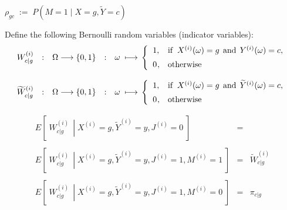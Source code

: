 $\rho_{gc} \;:=\; P\!\left(M=1\;\vert\;X=g,\widetilde{Y}=c\right)$

\vskip 0.3cm
\noindent
Define the following Bernoulli random variables (indicator variables):
\begin{equation*}
\begin{array}{ccccl}
	W^{(i)}_{c \vert g} &:& \Omega \longrightarrow \{0,1\} &:& \omega\;\longmapsto\,
	\left\{
		\begin{array}{cl}
		1, & \textnormal{if}\;\; X^{(i)}(\omega) = g \,\;\textnormal{and}\;\, Y^{(i)}(\omega) = c,
		\\
		\overset{{\color{white}-}}{0}, & \textnormal{otherwise}
		\end{array}
	\right.
\\ \\
	\widetilde{W}^{(i)}_{c \vert g} &:& \Omega \longrightarrow \{0,1\} &:& \omega\;\longmapsto\,
	\left\{
		\begin{array}{cl}
		1, & \textnormal{if}\;\; X^{(i)}(\omega) = g \,\;\textnormal{and}\;\, \widetilde{Y}^{(i)}(\omega) = c,
		\\
		\overset{{\color{white}-}}{0}, & \textnormal{otherwise}
		\end{array}
	\right.
\end{array}
\end{equation*}

\vskip 0.3cm
\noindent
\begin{equation*}
\begin{array}{lcl}
E\!\left[\;\left.W^{(i)}_{c \vert g}\,\;\right\vert\;X^{(i)}=g,\widetilde{Y}^{(i)}=y,J^{(i)}=0\;\right]
&=& 
\\ \\
E\!\left[\;\left.W^{(i)}_{c \vert g}\,\;\right\vert\;X^{(i)}=g,\widetilde{Y}^{(i)}=y,J^{(i)}=1,M^{(i)}=1\;\right]
&=& \widetilde{W}^{(i)}_{c \vert g}
\\ \\
E\!\left[\;\left.W^{(i)}_{c \vert g}\,\;\right\vert\;X^{(i)}=g,\widetilde{Y}^{(i)}=y,J^{(i)}=1,M^{(i)}=0\;\right]
&=& \pi_{c \vert g}
\end{array}
\end{equation*}

